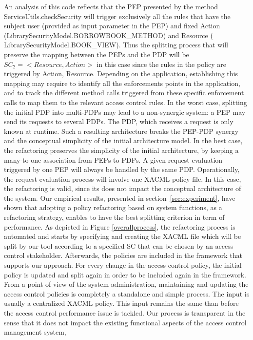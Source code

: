 An analysis of this code reflects that the PEP presented by the method ServiceUtils.checkSecurity will trigger exclusively all the rules 
that have the subject user (provided as input parameter in the PEP) and fixed Action (LibrarySecurityModel.BORROWBOOK\_METHOD) and Resource ( LibrarySecurityModel.BOOK\_VIEW).
Thus the splitting process that will preserve the mapping between the PEPs and the PDP will be $SC_{2}=<Resource,Action>$ in this case since the rules in the policy are triggered 
by Action, Resource. Depending on the application, establishing this mapping may require to identify all the enforcements points in the application, and to 
track the different method calls triggered from these specific enforcement calls to map them to the relevant access control rules.
In the worst case, splitting the initial PDP into multi-PDPs may lead to a non-synergic system: a PEP may send its requests to several PDPs. 
The PDP, which receives a request is only known at runtime. Such a resulting architecture breaks the PEP-PDP synergy and the conceptual 
simplicity of the initial architecture model. 
In the best case, the refactoring preserves the simplicity of the initial architecture, by keeping a many-to-one association from PEPs to PDPs. A given request evaluation 
triggered by one PEP will always be handled by the same PDP. Operationally, the request evaluation process will involve 
one XACML policy file. In this case, the refactoring is valid, since its does not impact the conceptual architecture of the system.
Our empirical results, presented in section~\ref{sec:experiment}, have shown that adopting a policy refactoring based on system functions, as a refactoring strategy, enables to 
have the best splitting criterion in term of performance. 
As depicted in Figure \ref{overallprocess}, the refactoring process is automated and starts by specifying and creating the XACML file which 
will be split by our tool according to a specified SC that can be chosen by an access control stakeholder. Afterwards, the policies are included in the 
framework that supports our approach. For every change in the access control policy, the initial policy is updated and 
split again in order to be included again in the framework.
From a point of view of the system administration, maintaining and updating the access control policies is completely a standalone and simple
 process. The input is usually a centralized XACML policy. This input remains the same than before the access control performance issue is tackled.
Our process is transparent in the sense that it does not impact the existing functional aspects of the access control management system, 
